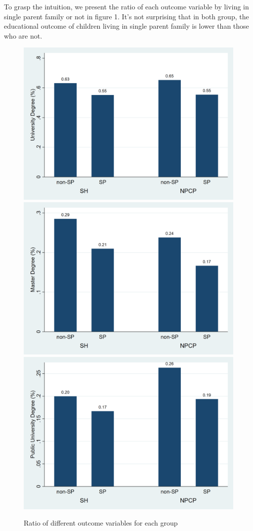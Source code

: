 \documentclass[]{AEA}
\begin{document}
    To grasp the intuition, we present the ratio of each outcome variable by living in single parent family or not in figure 1.  It's not surprising that in both group, the educational outcome of children living in single parent family is lower than those who are not.  

    \begin{figure}
        \caption{Ratio of different outcome variables for each group}
        \includegraphics[scale=0.13]{university_sp.png}
        \includegraphics[scale=0.13]{master_sp.png}
        \includegraphics[scale=0.13]{public_sp.png}

\end{figure}
\end{document}

